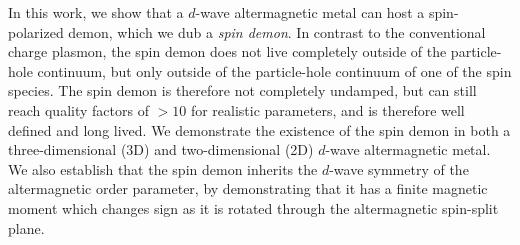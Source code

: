 \documentclass[aps,prl,reprint,twocolumns,superscriptaddress]{revtex4-2}
\begin{document}
	
	In this work, we show that a $d$-wave altermagnetic metal can host a spin-polarized demon, which we dub a \emph{spin demon}. In contrast to the conventional charge plasmon, the spin demon does not live completely outside of the particle-hole continuum, but only outside of the particle-hole continuum of one of the spin species. The spin demon is therefore not completely undamped, but can still reach quality factors of $>10$ for realistic parameters, and is therefore well defined and long lived. We demonstrate the existence of the spin demon in both a three-dimensional (3D) and two-dimensional (2D) $d$-wave altermagnetic metal. We also establish that the spin demon inherits the $d$-wave symmetry of the altermagnetic order parameter, by demonstrating that it has a finite magnetic moment which changes sign as it is rotated through the altermagnetic spin-split plane.
\end{document}
